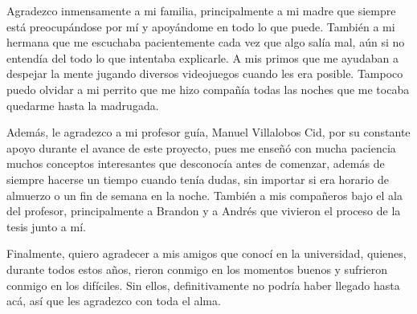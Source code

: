 \begin{agradecimiento}
Agradezco inmensamente a mi familia, principalmente a mi madre que siempre está preocupándose por mí y apoyándome en todo lo que puede. También a mi hermana que me escuchaba pacientemente cada vez que algo salía mal, aún si no entendía del todo lo que intentaba explicarle. A mis primos que me ayudaban a despejar la mente jugando diversos videojuegos cuando les era posible. Tampoco puedo olvidar a mi perrito que me hizo compañía todas las noches que me tocaba quedarme hasta la madrugada.

Además, le agradezco a mi profesor guía, Manuel Villalobos Cid, por su constante apoyo durante el avance de este proyecto, pues me enseñó con mucha paciencia muchos conceptos interesantes que desconocía antes de comenzar, además de siempre hacerse un tiempo cuando tenía dudas, sin importar si era horario de almuerzo o un fin de semana en la noche. También a mis compañeros bajo el ala del profesor, principalmente a Brandon y a Andrés que vivieron el proceso de la tesis junto a mí.

Finalmente, quiero agradecer a mis amigos que conocí en la universidad, quienes, durante todos estos años, rieron conmigo en los momentos buenos y sufrieron conmigo en los difíciles. Sin ellos, definitivamente no podría haber llegado hasta acá, así que les agradezco con toda el alma.

\end{agradecimiento}
